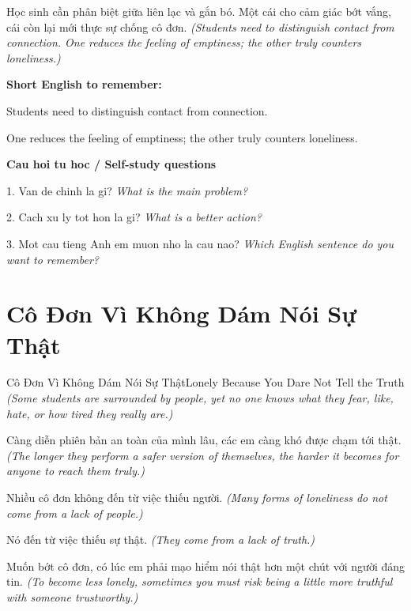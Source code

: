 \begin{baihoc}
Học sinh cần phân biệt giữa liên lạc và gắn bó. Một cái cho cảm giác bớt vắng, cái còn lại mới thực sự chống cô đơn.
\textit{(Students need to distinguish contact from connection. One reduces the feeling of emptiness; the other truly counters loneliness.)}
\end{baihoc}

\begin{ghinhoanh}
\textbf{Short English to remember:}

Students need to distinguish contact from connection.

One reduces the feeling of emptiness; the other truly counters loneliness.

\end{ghinhoanh}

\begin{tuhocnhanh}
\textbf{Cau hoi tu hoc / Self-study questions}

1. Van de chinh la gi? \textit{What is the main problem?}

2. Cach xu ly tot hon la gi? \textit{What is a better action?}

3. Mot cau tieng Anh em muon nho la cau nao? \textit{Which English sentence do you want to remember?}
\end{tuhocnhanh}
\ngancach

\section{Cô Đơn Vì Không Dám Nói Sự Thật}
\begin{truyen}{Cô Đơn Vì Không Dám Nói Sự Thật}{Lonely Because You Dare Not Tell the Truth}
\textit{(Some students are surrounded by people, yet no one knows what they fear, like, hate, or how tired they really are.)}

Càng diễn phiên bản an toàn của mình lâu, các em càng khó được chạm tới thật.
\textit{(The longer they perform a safer version of themselves, the harder it becomes for anyone to reach them truly.)}

Nhiều cô đơn không đến từ việc thiếu người.
\textit{(Many forms of loneliness do not come from a lack of people.)}

Nó đến từ việc thiếu sự thật.
\textit{(They come from a lack of truth.)}

Muốn bớt cô đơn, có lúc em phải mạo hiểm nói thật hơn một chút với người đáng tin.
\textit{(To become less lonely, sometimes you must risk being a little more truthful with someone trustworthy.)}

\end{truyen}

